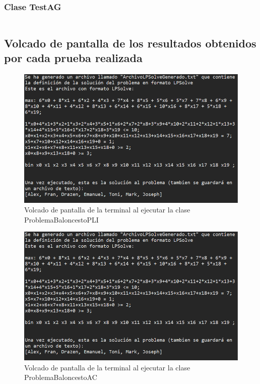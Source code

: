\documentclass[a4paper,12pt]{article}
\begin{document}
\subsubsection{Clase TestAG}
\inputminted[fontsize=\footnotesize,breaklines]{java}{src/andalu30/PracticaIndividual1/TestAG.java}

\subsection{Volcado de pantalla de los resultados obtenidos por cada prueba realizada}

\begin{figure}[h]
  \includegraphics{AlgoritmoPLI.PNG}
  \caption{Volcado de pantalla de la terminal al ejecutar la clase ProblemaBaloncestoPLI}
  \label{fig:pli}
\end{figure}

\begin{figure}[h]
  \includegraphics{AlgoritmoPLI.PNG}
  \caption{Volcado de pantalla de la terminal al ejecutar la clase ProblemaBaloncestoAC}
  \label{fig:ag}
\end{figure}
\end{document}
